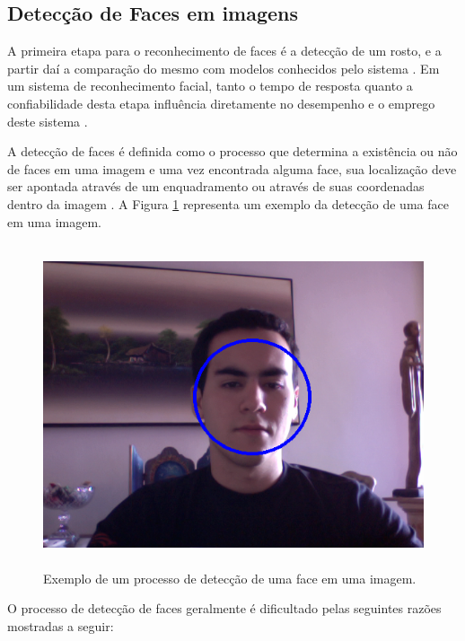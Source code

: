 
\subsection{Detecção de Faces em imagens}
	
A primeira etapa para o reconhecimento de faces é a detecção de um rosto, e a partir daí a comparação do mesmo com modelos conhecidos pelo sistema \cite{hong, oliveira}. Em um sistema de reconhecimento facial, tanto o tempo de resposta quanto a confiabilidade desta etapa influência diretamente no desempenho e o emprego deste sistema \cite{oliveira}.

A detecção de faces é definida como o processo que determina a existência ou não de faces em uma imagem e uma vez encontrada alguma face, sua localização deve ser apontada através de um enquadramento ou através de suas coordenadas dentro da imagem \cite{oliveira}. A Figura \ref{enquadramentoRosto} representa um exemplo da detecção de uma face em uma imagem.

	\begin{figure}[hbt]
		\begin{center}
			\includegraphics[height=9.5cm,width=12.5cm]{figuras/2.FundamentacaoTeorica/enquadramentoRosto.png}
		\end{center}
		\caption{Exemplo de um processo de detecção de uma face em uma imagem.}
		\label{enquadramentoRosto}
	\end{figure}

O processo de detecção de faces geralmente é dificultado pelas seguintes razões mostradas a seguir:

